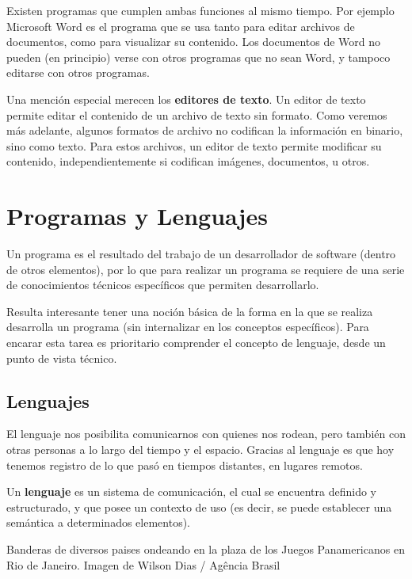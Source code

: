 Existen programas que cumplen ambas funciones al mismo tiempo. Por ejemplo
Microsoft Word es el programa que se usa tanto para editar archivos de documentos,
como para visualizar su contenido. Los documentos de Word no pueden (en principio)
verse con otros programas que no sean Word, y tampoco editarse con otros programas.

Una mención especial merecen los \textbf{editores de texto}. Un editor de texto
permite editar el contenido de un archivo de texto sin formato. Como veremos más
adelante, algunos formatos de archivo no codifican la información en binario,
sino como texto. Para estos archivos, un editor de texto permite modificar su
contenido, independientemente si codifican imágenes, documentos, u otros.

\section{Programas y Lenguajes}

Un programa es el resultado del trabajo de un desarrollador de software (dentro
de otros elementos), por lo que para realizar un programa se requiere de una serie
de conocimientos técnicos específicos que permiten desarrollarlo.

Resulta interesante tener una noción básica de la forma en la que se realiza 
desarrolla un programa (sin internalizar en los conceptos específicos). Para
encarar esta tarea es prioritario comprender el concepto de lenguaje, desde un
punto de vista técnico.

\subsection{Lenguajes}

El lenguaje nos posibilita comunicarnos con quienes nos rodean, pero también
con otras personas a lo largo del tiempo y el espacio. Gracias al lenguaje
es que hoy tenemos registro de lo que pasó en tiempos distantes, en lugares remotos.

\begin{definition}
    Un \textbf{lenguaje} es un sistema de comunicación, el cual se encuentra definido y
    estructurado, y que posee un contexto de uso (es decir, se puede establecer
    una semántica a determinados elementos).
\end{definition}

{Banderas de diversos paises ondeando en la plaza de los Juegos Panamericanos en Rio de Janeiro.}
{Imagen de Wilson Dias / Ag\^encia Brasil}


